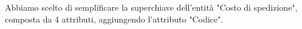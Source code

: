 Abbiamo scelto di semplificare la superchiave dell'entità "Costo di spedizione", composta da 4 attributi, aggiungendo l'attributo "Codice".


\noindent{}




